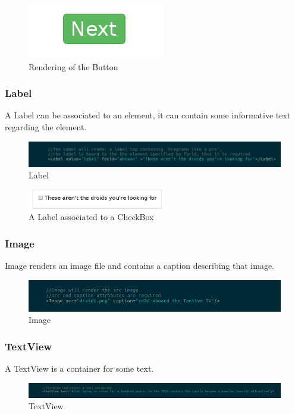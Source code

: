 \begin{figure}[H]
	\centering
	\includegraphics[width=6cm]{../../documenti/UserManualFramework/graphical_elements/buttonGE.png}
	\caption{Rendering of the Button}
\end{figure}

\subsubsection{Label}
A Label can be associated to an  element, it can contain some informative text regarding the element.
\begin{figure}[H]
	\centering
	\includegraphics[width=14cm]{../../documenti/UserManualFramework/framework_view/12framework_view_label.png}
	\caption{Label}
\end{figure}

\begin{figure}[H]
	\centering
	\includegraphics[width=6cm]{../../documenti/UserManualFramework/graphical_elements/labelGE.png}
	\caption{A Label associated to a CheckBox}
\end{figure}

\subsubsection{Image}
Image renders an image file and contains a caption describing that image.
\begin{figure}[H]
	\centering
	\includegraphics[width=14cm]{../../documenti/UserManualFramework/framework_view/13framework_view_image.png}
	\caption{Image}
\end{figure}

\subsubsection{TextView}
A TextView is a container for some text.
\begin{figure}[H]
	\centering
	\includegraphics[width=14cm]{../../documenti/UserManualFramework/framework_view/14framework_view_textview.png}
	\caption{TextView}
\end{figure}

